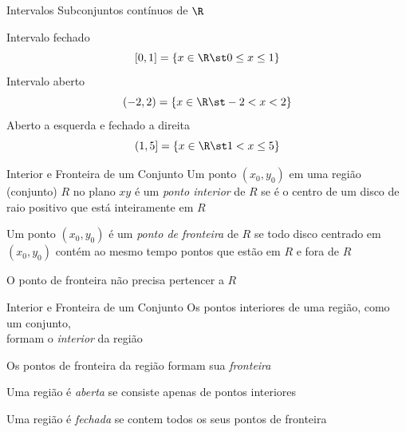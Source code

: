 \documentclass[fleqn,utf8,aspectratio=169,12pt,ignorenonframetext]{beamer}
\begin{document}
%
%
%

\begin{frame}{Intervalos}
  Subconjuntos contínuos de $\R$
  \vspace{\baselineskip}

  \pause
  Intervalo fechado
  \[
    [0, 1] = \left\{ x\in\R\st 0 \leq x \leq 1 \right\}
  \]
  \pause
  Intervalo aberto
  \[
    (-2, 2) = \left\{ x\in\R\st -2 < x < 2 \right\}
  \]
  \pause
  Aberto a esquerda e fechado a direita
  \[
    (1, 5] = \left\{ x\in\R\st 1 < x \leq 5 \right\}
  \]
\end{frame}

\begin{frame}{Interior e Fronteira de um Conjunto}
  Um ponto $(x_0, y_0)$ em uma região (conjunto) $R$ no plano $xy$ é um
  \emph{ponto interior} de $R$ se é o centro de um disco de raio positivo que está
  inteiramente em $R$

  \pause
  \vspace{\baselineskip}
  Um ponto $(x_0, y_0)$ é um \emph{ponto de fronteira} de $R$ se todo disco
  centrado em $(x_0, y_0)$ contém ao mesmo tempo pontos que estão em $R$ e fora de $R$

  \pause
  \vspace{\baselineskip}
  O ponto de fronteira não precisa pertencer a $R$
\end{frame}

\begin{frame}{Interior e Fronteira de um Conjunto}
  Os pontos interiores de uma região, como um conjunto, \\
  formam o \emph{interior} da região

  \pause
  \vspace{\baselineskip}
  Os pontos de fronteira da região formam sua \emph{fronteira}

  \pause
  \vspace{\baselineskip}
  Uma região é \emph{aberta} se consiste apenas de pontos interiores

  \pause
  \vspace{\baselineskip}
  Uma região é \emph{fechada} se contem todos os seus pontos de fronteira
\end{frame}
\end{document}

